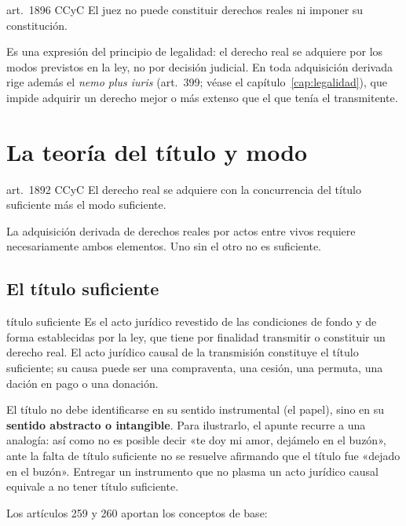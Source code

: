 \documentclass[12pt,oneside]{book}
\begin{document}
\begin{regla}{art.~1896 CCyC}
El juez no puede constituir derechos reales ni imponer su constitución.
\end{regla}

Es una expresión del principio de legalidad: el derecho real se adquiere por los modos previstos en la ley, no por decisión judicial. En toda adquisición derivada rige además el \textit{nemo plus iuris} (art.~399; véase el capítulo~\ref{cap:legalidad}), que impide adquirir un derecho mejor o más extenso que el que tenía el transmitente.

\section{La teoría del título y modo}

\begin{regla}{art.~1892 CCyC}
El derecho real se adquiere con la concurrencia del título suficiente más el modo suficiente.
\end{regla}

La adquisición derivada de derechos reales por actos entre vivos requiere necesariamente ambos elementos. Uno sin el otro no es suficiente.

\subsection{El título suficiente}

\begin{definicion}{título suficiente}
Es el acto jurídico revestido de las condiciones de fondo y de forma establecidas por la ley, que tiene por finalidad transmitir o constituir un derecho real. El acto jurídico causal de la transmisión constituye el título suficiente; su causa puede ser una compraventa, una cesión, una permuta, una dación en pago o una donación.
\end{definicion}

El título no debe identificarse en su sentido instrumental (el papel), sino en su \textbf{sentido abstracto o intangible}. Para ilustrarlo, el apunte recurre a una analogía: así como no es posible decir «te doy mi amor, dejámelo en el buzón», ante la falta de título suficiente no se resuelve afirmando que el título fue «dejado en el buzón». Entregar un instrumento que no plasma un acto jurídico causal equivale a no tener título suficiente.

Los artículos 259 y 260 aportan los conceptos de base:
\end{document}
